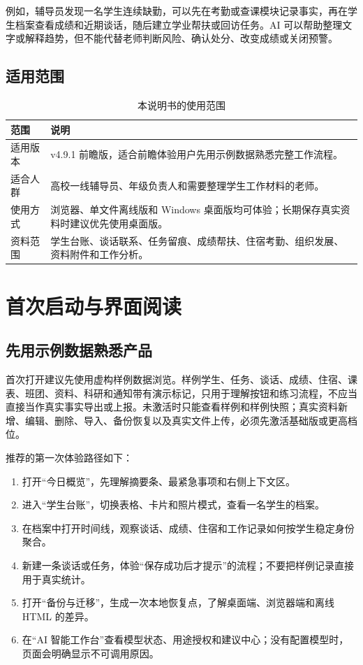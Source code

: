 \documentclass[UTF8,zihao=-4,oneside]{ctexrep}
\begin{document}
例如，辅导员发现一名学生连续缺勤，可以先在考勤或查课模块记录事实，再在学生档案查看成绩和近期谈话，随后建立学业帮扶或回访任务。AI 可以帮助整理文字或解释趋势，但不能代替老师判断风险、确认处分、改变成绩或关闭预警。

\section{适用范围}

\begin{table}[H]
\centering
\caption{本说明书的使用范围}
\begin{tabularx}{\textwidth}{B{30mm} Y}
\toprule
范围 & 说明 \\
\midrule
适用版本 & v4.9.1 前瞻版，适合前瞻体验用户先用示例数据熟悉完整工作流程。 \\
适合人群 & 高校一线辅导员、年级负责人和需要整理学生工作材料的老师。 \\
使用方式 & 浏览器、单文件离线版和 Windows 桌面版均可体验；长期保存真实资料时建议优先使用桌面版。 \\
资料范围 & 学生台账、谈话联系、任务留痕、成绩帮扶、住宿考勤、组织发展、资料附件和工作分析。 \\
\bottomrule
\end{tabularx}
\end{table}

\chapter{首次启动与界面阅读}

\section{先用示例数据熟悉产品}

首次打开建议先使用虚构样例数据浏览。样例学生、任务、谈话、成绩、住宿、课表、班团、资料、科研和通知带有演示标记，只用于理解按钮和练习流程，不应当直接当作真实事实导出或上报。未激活时只能查看样例和样例快照；真实资料新增、编辑、删除、导入、备份恢复以及真实文件上传，必须先激活基础版或更高档位。

推荐的第一次体验路径如下：

\begin{enumerate}
  \item 打开“今日概览”，先理解摘要条、最紧急事项和右侧上下文区。
  \item 进入“学生台账”，切换表格、卡片和照片模式，查看一名学生的档案。
  \item 在档案中打开时间线，观察谈话、成绩、住宿和工作记录如何按学生稳定身份聚合。
  \item 新建一条谈话或任务，体验“保存成功后才提示”的流程；不要把样例记录直接用于真实统计。
  \item 打开“备份与迁移”，生成一次本地恢复点，了解桌面端、浏览器端和离线 HTML 的差异。
  \item 在“AI 智能工作台”查看模型状态、用途授权和建议中心；没有配置模型时，页面会明确显示不可调用原因。
\end{enumerate}
\end{document}
